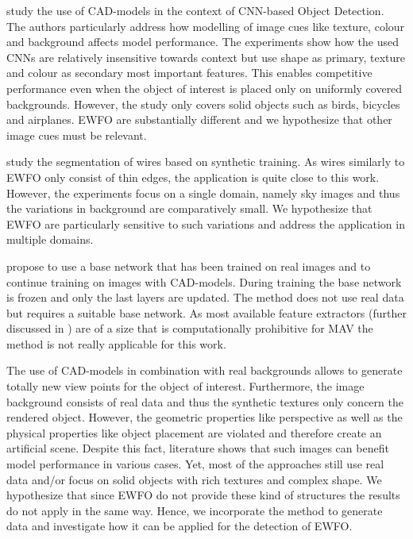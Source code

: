 \citeauthor{Peng}\cite{Peng} study the use of \ac{CAD}-models in the context of \ac{CNN}-based Object Detection. The authors particularly address how modelling of image cues like texture, colour and background affects model performance. The experiments show how the used \acp{CNN} are relatively insensitive towards context but use shape as primary, texture and colour as secondary most important features. This enables competitive performance even when the object of interest is placed only on uniformly covered backgrounds. However, the study only covers solid objects such as birds, bicycles and airplanes. \ac{EWFO} are substantially different and we hypothesize that other image cues must be relevant.

\citeauthor{Madaan2017}\cite{Madaan2017} study the segmentation of wires based on synthetic training. As wires similarly to \ac{EWFO} only consist of thin edges, the application is quite close to this work. However, the experiments focus on a single domain, namely sky images and thus the variations in background are comparatively small. We hypothesize that \ac{EWFO} are particularly sensitive to such variations and address the application in multiple domains.

\citeauthor{Hinterstoisser2017} \cite{Hinterstoisser2017} propose to use a base network that has been trained on real images and to continue training on images with \ac{CAD}-models. During training the base network is frozen and only the last layers are updated. The method does not use real data but requires a suitable base network. As most available feature extractors (further discussed in ) are of a size that is computationally prohibitive for \ac{MAV} the method is not really applicable for this work. 

The use of CAD-models in combination with real backgrounds allows to generate totally new view points for the object of interest. Furthermore, the image background consists of real data and thus the synthetic textures only concern the rendered object. However, the geometric properties like perspective as well as the physical properties like object placement are violated and therefore create an artificial scene. Despite this fact, literature shows that such images can benefit model performance in various cases. Yet, most of the approaches still use real data and/or focus on solid objects with rich textures and complex shape. We hypothesize that since \ac{EWFO} do not provide these kind of structures the results do not apply in the same way. Hence, we incorporate the method to generate data and investigate how it can be applied for the detection of \ac{EWFO}.

